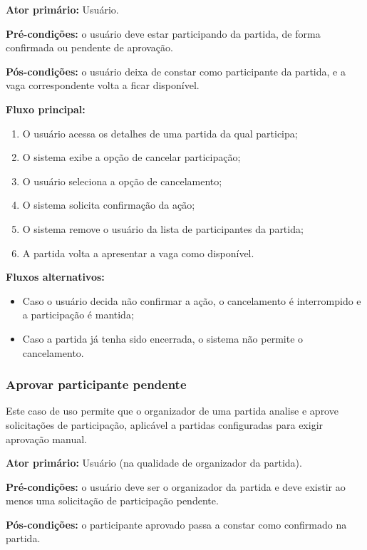 \documentclass[a4paper, 12pt]{article}
\begin{document}
\begin{justify}
\textbf{Ator primário:} Usuário.

\textbf{Pré-condições:} o usuário deve estar participando da partida, de forma confirmada ou pendente de aprovação.

\textbf{Pós-condições:} o usuário deixa de constar como participante da partida, e a vaga correspondente volta a ficar disponível.

\textbf{Fluxo principal:}

\begin{enumerate}
    \item O usuário acessa os detalhes de uma partida da qual participa;
    \item O sistema exibe a opção de cancelar participação;
    \item O usuário seleciona a opção de cancelamento;
    \item O sistema solicita confirmação da ação;
    \item O sistema remove o usuário da lista de participantes da partida;
    \item A partida volta a apresentar a vaga como disponível.
\end{enumerate}

\textbf{Fluxos alternativos:}

\begin{itemize}
    \item Caso o usuário decida não confirmar a ação, o cancelamento é interrompido e a participação é mantida;
    \item Caso a partida já tenha sido encerrada, o sistema não permite o cancelamento.
\end{itemize}

\subsubsection{Aprovar participante pendente}

Este caso de uso permite que o organizador de uma partida analise e aprove solicitações de participação, aplicável a partidas configuradas para exigir aprovação manual.

\textbf{Ator primário:} Usuário (na qualidade de organizador da partida).

\textbf{Pré-condições:} o usuário deve ser o organizador da partida e deve existir ao menos uma solicitação de participação pendente.

\textbf{Pós-condições:} o participante aprovado passa a constar como confirmado na partida.


\end{justify}
\end{document}
